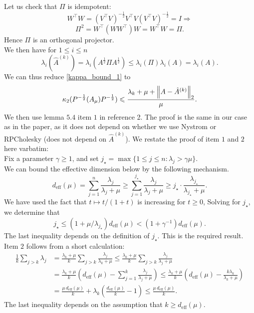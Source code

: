 \documentclass[12pt,letterpaper]{article}
\renewcommand{\le}{\leqslant}
\newcommand{\snorm}[1]{\norm{#1}_2}
\newcommand{\precond}[1]{P^{-\frac{1}{2}}(#1) P^{-\frac{1}{2}}}
\newcommand{\RPCPrecond}{\precond{A_\mu}}
\newcommand{\RPC}{\hat A^{(k)}}
\begin{document}
\begin{enumerate}
    Let us check that $\Pi$ is idempotent:
    $$
    W^\top W = (V^\top V)^{-\frac{1}{2}}V^\top V(V^\top V)^{-\frac{1}{2}} = I \Rightarrow
    $$
    $$
    \Pi^2 = W^\top (WW^\top) W = W^\top W = \Pi.
    $$
    Hence $\Pi$ is an orthogonal projector.\\
    We then have for $1\le i \le n$
    $$
    \lambda_i(\RPC) = \lambda_i(A^{\frac{1}{2}}\Pi  A^{\frac{1}{2}}) \le 
    \lambda_i(\Pi)\lambda_i(A)
    = \lambda_i(A).
    $$
    We can thus reduce \autoref{kappa_bound_1} to 
    \begin{equation}
        \label{kappa_bound2}
        \kappa_2(\RPCPrecond) \le \frac{\lambda_k + \mu + \snorm{A-\RPC}}{\mu}.
    \end{equation}
    We then use lemma $5.4$ item $1$ in reference 2. The proof is the same in our case as in the paper, as it does not depend on whether we use Nystrom or RPCholesky (does not depend on $\RPC$). We restate the proof of item $1$ and $2$ here varbatim:\\
    Fix a parameter $\gamma \geq 1$, and set $j_{\star} = \max\{1\leq j\leq n: \lambda_{j}>\gamma\mu\}$.\\
We can bound the effective dimension below by the following mechanism.
\[
d_{\textrm{eff}}(\mu)
    =  \sum^{n}_{j=1}\frac{\lambda_{j}}{\lambda_{j}+\mu}
    \geq \sum^{j_{\star}}_{j=1}\frac{\lambda_{j}}{\lambda_{j}+\mu}\geq  j_{\star} \cdot \frac{\lambda_{j_{\star}}}{\lambda_{j_{\star}}+\mu}.
\]
We have used the fact that $t \mapsto t/(1+t)$ is increasing for $t \geq 0$,
Solving for $j_{\star}$, we determine that
\[
j_{\star}\leq(1+\mu/\lambda_{j_{\star}})d_{\textrm{eff}}(\mu)<(1+\gamma^{-1})d_{\textrm{eff}}(\mu).
\]
The last inequality depends on the definition of $j_{\star}$.  This is the required result.\\
Item $2$ follows from a short calculation:
\[
\begin{aligned}
\frac{1}{k}\sum_{j>k}\lambda_{j}
    &= \frac{\lambda_k+\mu}{k}\sum_{j>k}\frac{\lambda_{j}}{\lambda_{k}+\mu}
    \leq \frac{\lambda_k+\mu}{k}\sum_{j>k}\frac{\lambda_{j}}{\lambda_{j}+\mu} \\
    &= \frac{\lambda_k+\mu}{k}\left(d_{\textrm{eff}}(\mu)-\sum^{k}_{j=1}\frac{\lambda_{j}}{\lambda_{j}+\mu}\right)
    \leq\frac{\lambda_k+\mu}{k}\left(d_{\textrm{eff}}(\mu)-\frac{k\lambda_{k}}{\lambda_{k}+\mu}\right) \\
    &= \frac{\mu \,d_{\textrm{eff}}(\mu)}{k} +\lambda_{k}\left(\frac{d_{\textrm{eff}}(\mu)}{k}-1\right)
    \leq \frac{\mu \, d_{\textrm{eff}}(\mu)}{k}.
\end{aligned}
\]
The last inequality depends on the assumption that $k\geq d_{\textrm{eff}}(\mu)$.


\end{enumerate}
\end{document}

